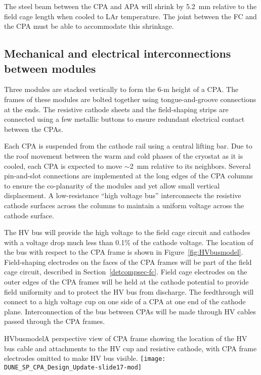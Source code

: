 The steel beam between the CPA and APA will shrink by 5.2~mm relative to the field cage length when cooled to LAr temperature.  The joint between the FC and the CPA must be able to accommodate this shrinkage.



\subsection{Mechanical and electrical interconnections between modules}

Three modules are stacked vertically to form the 6-m height of a CPA. %
The frames of these modules are bolted together using tongue-and-groove connections at the ends. The resistive cathode sheets and the field-shaping strips are connected using a few metallic buttons to ensure redundant electrical contact between the CPAs. %

Each CPA is suspended from the cathode rail using a central lifting bar.  Due to the roof movement between the warm and cold phases of the cryostat as it is cooled, each CPA is expected to move $\sim$2~mm relative to its neighbors.  Several pin-and-slot connections are implemented at the long edges of the CPA columns to ensure the co-planarity of the modules and yet allow small vertical displacement.  A low-resistance
``high voltage bus''  interconnects the resistive cathode surfaces across the columns to maintain a uniform voltage across the cathode surface.

The HV bus will provide the high voltage to the field cage
circuit and cathodes with a voltage drop much less than 0.1\% of the
cathode voltage. The location of the bus with respect to the CPA frame is shown in Figure~\ref{fig:HVbusmodel}. Field-shaping electrodes on the faces of the CPA
frames  will be part of the field cage circuit, described in Section~\ref{detcompsec-fc}. 
Field cage electrodes on the outer edges of the
CPA frames  will be held at the cathode potential to provide field
uniformity and to protect the HV bus from discharge.  The feedthrough
will connect to a high voltage cup on one side of a CPA at one end of
the cathode plane.  Interconnection of the bus between CPAs will be made
through HV cables passed through the CPA frames. 

\begin{cdrfigure}{HVbusmodel}{A perspective view of CPA frame showing the location of the HV bus cable and attachments to the HV cup and resistive cathode, with CPA frame electrodes omitted to make HV bus visible.}
\texttt{[image: DUNE\_SP\_CPA\_Design\_Update-slide17-mod]}
\end{cdrfigure}


